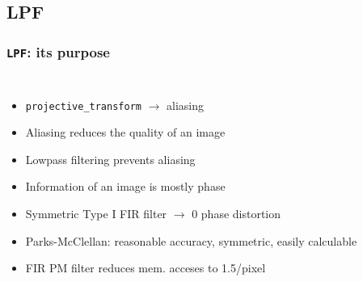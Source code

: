 \documentclass{beamer}
\begin{document}
\subsection{LPF}
\begin{frame}
	\frametitle{{\tt LPF}: its purpose}
	\begin{columns}[c]
		\begin{itemize}
		\item<1-> {\tt projective\_transform} \(\rightarrow\) aliasing
		\item<2-> Aliasing reduces the quality of an image
		\item<3-> Lowpass filtering prevents aliasing
		\item<6-> Information of an image is mostly phase
		\item<7-> Symmetric Type I FIR filter \(\rightarrow\) 0 phase distortion
		\item<8-> Parks-McClellan: reasonable accuracy, symmetric, easily calculable
		\item<9-> FIR PM filter reduces mem. acceses to 1.5/pixel
		\end{itemize}
	

\end{columns}
\end{frame}
\end{document}
